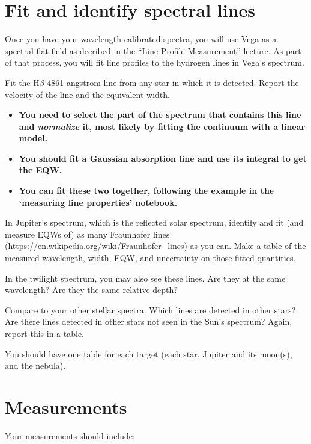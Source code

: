 \documentclass[11pt]{article}
\begin{document}
\section{Fit and identify spectral lines}

Once you have your wavelength-calibrated spectra, you will use Vega as a spectral flat field as decribed
in the ``Line Profile Measurement'' lecture.  As part of that process, you will fit line profiles to the
hydrogen lines in Vega's spectrum.

Fit the H$\beta$ 4861 angstrom line from any star in which it is detected.
Report the velocity of the line and the equivalent width.
\begin{itemize}
    \item \textbf{You need to select the part of the spectrum that contains this line and \emph{normalize} it,
        most likely by fitting the continuum with a linear model.}
    \item \textbf{You should fit a Gaussian absorption line and use its integral to get the EQW.}
    \item \textbf{You can fit these two together, following the example in the `measuring line properties' notebook.}
\end{itemize}



In Jupiter's spectrum, which is the reflected solar spectrum, identify and fit (and measure EQWs of) as many Fraunhofer lines
(\url{https://en.wikipedia.org/wiki/Fraunhofer_lines}) as you can.
Make a table of the measured wavelength, width, EQW, and uncertainty on
those fitted quantities.

In the twilight spectrum, you may also see these lines.  Are they at the same wavelength?  Are they the same relative depth?

Compare to your other stellar spectra.  Which lines are detected in other stars?  Are there lines detected in other stars not seen in the Sun's spectrum?
Again, report this in a table.

You should have one table for each target (each star, Jupiter and its moon(s), and the nebula).

\section{Measurements}

Your measurements should include:
\end{document}
